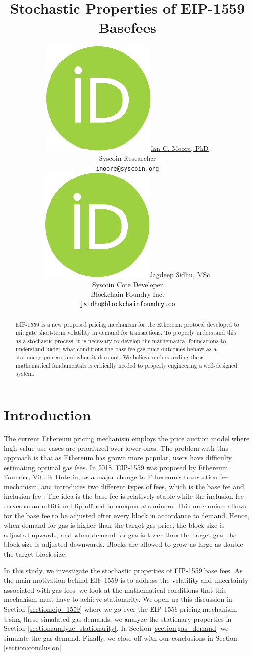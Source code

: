 \documentclass{article}
\title{Stochastic Properties of EIP-1559 Basefees}
\author{ \href{https://orcid.org/0000-0000-0000-0000}{\includegraphics[scale=0.06]{orcid.pdf}\hspace{1mm}Ian C. Moore, PhD}\\
	Syscoin Researcher\\
	\texttt{imoore@syscoin.org} \\
	\And
	\href{https://orcid.org/0000-0000-0000-0000}{\includegraphics[scale=0.06]{orcid.pdf}\hspace{1mm}Jagdeep Sidhu, MSc} \\
	Syscoin Core Developer\\
	Blockchain Foundry Inc.\\
	\texttt{jsidhu@blockchainfoundry.co} \\
}
\begin{document}
\maketitle

\begin{abstract}
EIP-1559 is a new proposed pricing mechanism for the Ethereum protocol developed to mitigate short-term volatility in demand for transactions. To properly understand this as a stochastic process, it is necessary to develop the mathematical foundations to understand under what conditions the base fee gas price outcomes behave as a stationary process, and when it does not. We believe understanding these mathematical fundamentals is critically needed to properly engineering a well-designed system.
\end{abstract}


\section{Introduction}
The current Ethereum pricing mechanism employs the price auction model where high-value use cases are prioritized over lower ones. The problem with this approach is that as Ethereum has grown more popular, users have difficulty estimating optimal gas fees. In 2018, EIP-1559 was  proposed by Ethereum Founder, Vitalik Buterin, as a major change to Ethereum's transaction fee mechanism, and introduces two different types of fees, which is the base fee and inclusion fee \cite{But19,Rou20}. The idea is the base fee is relatively stable while the inclusion fee serves as an additional tip offered to compensate miners. This mechanism allows for the base fee to be adjusted after every block in accordance to demand. Hence, when demand for gas is higher than the target gas price, the block size is adjusted upwards, and when demand for gas is lower than the target gas, the block size is adjusted downwards. Blocks are allowed to grow as large as double the target block size.

In this study, we investigate the stochastic properties of EIP-1559 base fees. As the main motivation behind EIP-1559 is to address the volatility and uncertainty associated with gas fees, we look at the mathematical conditions that this mechanism must have to achieve stationarity. We open up this discussion in Section \ref{section:eip_1559} where we go over the EIP 1559 pricing mechanism. Using these simulated gas demands, we analyze the stationary properties in Section \ref{section:analyze_stationarity}. In Section \ref{section:gas_demand} we simulate the gas demand.  Finally, we close off with our conclusions in Section \ref{section:conclusion}.
\end{document}
